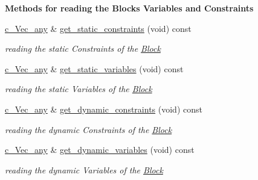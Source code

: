 \begin{Indent}\textbf{ Methods for reading the Block\textquotesingle{}s Variables and Constraints}\par
\begin{DoxyCompactItemize}
\item 
\mbox{\hyperlink{group___s_m_s__types_gaa16aeddc7a50d64299ee0f8d9ca5dc7d}{c\+\_\+\+Vec\+\_\+any}} \& \mbox{\hyperlink{class_s_m_spp__di__unipi__it_1_1_block_afaf2dca465cd70d9d76bcfe839e52aec}{get\+\_\+static\+\_\+constraints}} (void) const
\begin{DoxyCompactList}\small\item\em reading the {\itshape static} Constraints of the \mbox{\hyperlink{class_s_m_spp__di__unipi__it_1_1_block}{Block}} \end{DoxyCompactList}\item 
\mbox{\hyperlink{group___s_m_s__types_gaa16aeddc7a50d64299ee0f8d9ca5dc7d}{c\+\_\+\+Vec\+\_\+any}} \& \mbox{\hyperlink{class_s_m_spp__di__unipi__it_1_1_block_a6ca8b345bb506a8ac45eef39887bebea}{get\+\_\+static\+\_\+variables}} (void) const
\begin{DoxyCompactList}\small\item\em reading the {\itshape static} Variables of the \mbox{\hyperlink{class_s_m_spp__di__unipi__it_1_1_block}{Block}} \end{DoxyCompactList}\item 
\mbox{\hyperlink{group___s_m_s__types_gaa16aeddc7a50d64299ee0f8d9ca5dc7d}{c\+\_\+\+Vec\+\_\+any}} \& \mbox{\hyperlink{class_s_m_spp__di__unipi__it_1_1_block_a3f409f4fea9571956a95359dbeef7395}{get\+\_\+dynamic\+\_\+constraints}} (void) const
\begin{DoxyCompactList}\small\item\em reading the {\itshape dynamic} Constraints of the \mbox{\hyperlink{class_s_m_spp__di__unipi__it_1_1_block}{Block}} \end{DoxyCompactList}\item 
\mbox{\hyperlink{group___s_m_s__types_gaa16aeddc7a50d64299ee0f8d9ca5dc7d}{c\+\_\+\+Vec\+\_\+any}} \& \mbox{\hyperlink{class_s_m_spp__di__unipi__it_1_1_block_a9c17adfb0c344b44e163d40f7fc6926f}{get\+\_\+dynamic\+\_\+variables}} (void) const
\begin{DoxyCompactList}\small\item\em reading the {\itshape dynamic} Variables of the \mbox{\hyperlink{class_s_m_spp__di__unipi__it_1_1_block}{Block}} \end{DoxyCompactList}\item 

\end{DoxyCompactItemize}
\end{Indent}
